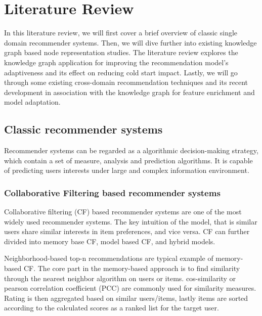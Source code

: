 \section{Literature Review}
In this literature review, we will first cover a brief overview of classic single domain recommender systems. Then, we will dive further into existing knowledge graph based node representation studies. The literature review explores the knowledge graph application for improving the recommendation model's adaptiveness and its effect on reducing cold start impact. Lastly, we will go through some existing cross-domain recommendation techniques and its recent development in association with the knowledge graph for feature enrichment and model adaptation.

\subsection{Classic recommender systems}
Recommender systems can be regarded as a algorithmic decision-making strategy, which contain a set of measure, analysis and prediction algorithms. It is capable of predicting users interests under large and complex information environment.

\bigskip
\subsubsection{Collaborative Filtering based recommender systems}
Collaborative filtering (CF) based recommender systems are one of the most widely used recommender systems. The key intuition of the model, that is similar users share similar interests in item preferences, and vice versa. CF can further divided into memory base CF, model based CF, and hybrid models.

Neighborhood-based top-n recommendations are typical example of memory-based CF. The core part in the memory-based approach is to find similarity through the nearest neighbor algorithm on users or items. cos-similarity or pearson correlation coefficient (PCC) \citep{sarwar2001item} are commonly used for similarity measures. Rating is then aggregated based on similar users/items, lastly items are sorted according to the calculated scores as a ranked list for the target user. 

